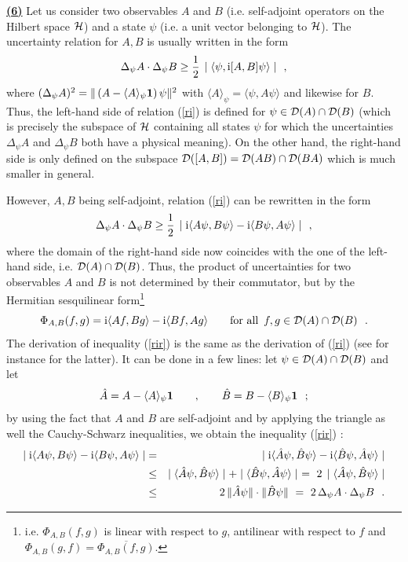 \documentclass[a4wide,12pt]{report}
\begin{document}
\underline{{\bf (6)}}
Let us consider two observables $A$ and $B$ 
(i.e. self-adjoint operators 
on the Hilbert space ${\cal H}$) and a state $\psi$ (i.e. a unit vector 
belonging to ${\cal H}$).
The uncertainty relation for $A,B$ is usually written in the form 
\cite{gap}
\begin{equation}
\label{ri}
\Delta_{\psi} A \cdot
\Delta_{\psi} B \geq \displaystyle{1 \over 2} \, \mid \langle \psi ,
{\rm i} [A, B] \psi \rangle \mid
\ \ ,
\end{equation}
where 
$(\Delta_{\psi} A)^2 = \| \left( A -
\langle A\rangle_{\psi} {\bf 1} \right) \psi \|^2$
with 
$\langle A\rangle_{\psi} = \langle \psi , A\psi \rangle$ and likewise 
for $B$.
Thus, the left-hand side of relation (\ref{ri}) is defined for 
$\psi \in {\cal D}(A) \cap {\cal D}(B)$
(which is precisely the subspace of ${\cal H}$ containing all states 
$\psi$ for which the uncertainties 
$\Delta_{\psi} A$ and 
$\Delta_{\psi} B$ both have a physical meaning). 
On the other hand, the right-hand side is only defined on the subspace 
${\cal D} ([A,B]) =
{\cal D} (AB) \cap
{\cal D} (BA)$ which is much smaller in general. 

However, $A,B$ being self-adjoint, relation (\ref{ri}) can be rewritten 
in the form \cite{krau}
\begin{equation}
\label{rir}
\Delta_{\psi} A \cdot
\Delta_{\psi} B \geq \displaystyle{1 \over 2} \, \mid {\rm i} \langle A\psi ,
B \psi \rangle - {\rm i} \langle B\psi , A \psi \rangle \mid
\ \ ,
\end{equation}
where the domain  of the right-hand side 
now coincides with the one of the left-hand side, i.e.  
${\cal D}(A) \cap {\cal D}(B)$.
Thus, the product of  
uncertainties for two observables 
$A$ and $B$ is not determined by their commutator, but by the 
 Hermitian sesquilinear form\footnote{i.e. 
 $\Phi_{A,B} (f,g)$ is linear with respect to $g$, 
 antilinear with respect to $f$
 and $\Phi_{A,B} (g,f) = \overline{\Phi_{A,B} (f,g)}$.}
\[
\Phi_{A,B} (f,g) =
{\rm i} \langle A f, Bg \rangle
-{\rm i} \langle B f , A g \rangle
\qquad \mbox{for all} \ \,  f,g \in
{\cal D}(A) \cap {\cal D}(B)
\ \ .
\]
The derivation of inequality (\ref{rir}) is the same as the 
derivation 
of (\ref{ri}) (see for instance \cite{krey} for the latter). 
It can be done in a few lines: 
 let $\psi \in {\cal D}(A) \cap {\cal D} (B)$ and let 
\[
\hat A = A - \langle A \rangle _{\psi} {\bf 1}
\qquad , \qquad
\hat B = B - \langle B \rangle _{\psi} {\bf 1}
\ \ ;
\]
by using the fact that $A$ and $B$ are self-adjoint and by applying
the triangle as well the Cauchy-Schwarz inequalities,
we obtain the inequality (\ref{rir}) :
\begin{eqnarray*}
\mid {\rm i} \langle A \psi , B \psi  \rangle
-{\rm i} \langle B \psi , A \psi \rangle \mid
& = &
\mid {\rm i} \langle \hat A \psi , \hat B \psi  \rangle
-{\rm i} \langle \hat B \psi , \hat A \psi \rangle \mid
\\
& \leq &
\mid  \langle \hat A \psi , \hat B \psi  \rangle  \mid +
\mid  \langle \hat B \psi , \hat A \psi  \rangle  \mid
\ = \ 2 \,
\mid  \langle \hat A \psi , \hat B \psi  \rangle  \mid
\\
& \leq &  2 \,
\| \hat A \psi \| \cdot
\| \hat B \psi \|  \ = \
2\, \Delta_{\psi} A \cdot
\Delta_{\psi} B
\ \ .
\end{eqnarray*}
\end{document}
